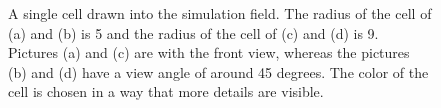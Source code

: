 \begin{figure}[ht]
	\begin{center}
	\end{center}
	\begin{center}
	\end{center}
	\caption[Drawn sphere cells with a radius of 5 and 9]{\label{img:DrawnSphereCellRadius5And9}A single cell drawn into the simulation field. The radius of the cell of (a) and (b) is 5 and the radius of the cell of (c) and (d) is 9. Pictures (a) and (c) are with the front view, whereas the
pictures (b) and (d) have a view angle of around 45 degrees. The color of the cell is chosen in
a way that more details are visible.}
\end{figure}

